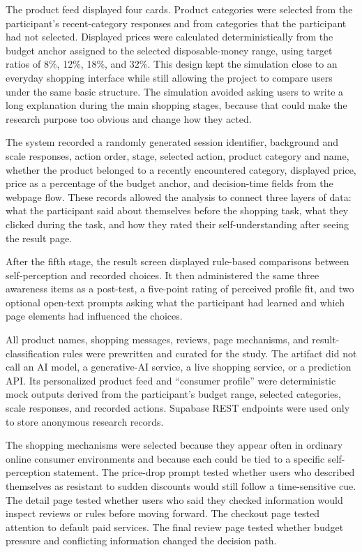 \documentclass[stu,12pt,floatsintext]{apa7}
\begin{document}
The product feed displayed four cards. Product categories were selected from the participant's recent-category responses and from categories that the participant had not selected. Displayed prices were calculated deterministically from the budget anchor assigned to the selected disposable-money range, using target ratios of 8\%, 12\%, 18\%, and 32\%. This design kept the simulation close to an everyday shopping interface while still allowing the project to compare users under the same basic structure. The simulation avoided asking users to write a long explanation during the main shopping stages, because that could make the research purpose too obvious and change how they acted.

The system recorded a randomly generated session identifier, background and scale responses, action order, stage, selected action, product category and name, whether the product belonged to a recently encountered category, displayed price, price as a percentage of the budget anchor, and decision-time fields from the webpage flow. These records allowed the analysis to connect three layers of data: what the participant said about themselves before the shopping task, what they clicked during the task, and how they rated their self-understanding after seeing the result page.

After the fifth stage, the result screen displayed rule-based comparisons between self-perception and recorded choices. It then administered the same three awareness items as a post-test, a five-point rating of perceived profile fit, and two optional open-text prompts asking what the participant had learned and which page elements had influenced the choices.

All product names, shopping messages, reviews, page mechanisms, and result-classification rules were prewritten and curated for the study. The artifact did not call an AI model, a generative-AI service, a live shopping service, or a prediction API. Its personalized product feed and ``consumer profile'' were deterministic mock outputs derived from the participant's budget range, selected categories, scale responses, and recorded actions. Supabase REST endpoints were used only to store anonymous research records.

The shopping mechanisms were selected because they appear often in ordinary online consumer environments and because each could be tied to a specific self-perception statement. The price-drop prompt tested whether users who described themselves as resistant to sudden discounts would still follow a time-sensitive cue. The detail page tested whether users who said they checked information would inspect reviews or rules before moving forward. The checkout page tested attention to default paid services. The final review page tested whether budget pressure and conflicting information changed the decision path.
\end{document}
